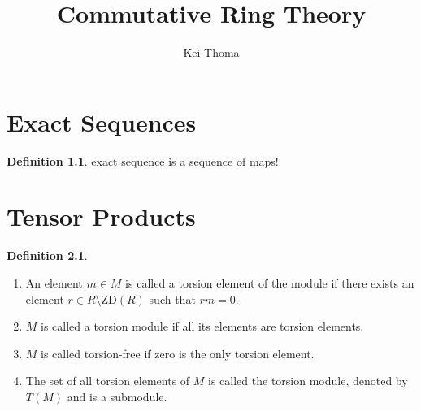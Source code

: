 \documentclass[a4paper]{book}
\title{Commutative Ring Theory}
\author{Kei Thoma}
\theoremstyle{definition}
\newtheorem{definition}{Definition}[]
\begin{document}
\chapter{Exact Sequences}
\begin{defbox}
    \begin{definition}
        exact sequence is a sequence of maps!
    \end{definition}
\end{defbox}

\chapter{Tensor Products}
\begin{defbox}
    \begin{definition}
        \begin{enumerate}
            \item An element \(m \in M\) is called a {\color{maththen}torsion element} of the module if there exists an element \(r \in R \setminus \text{ZD}(R)\) such that \(rm = 0\).
            \item \(M\) is called a {\color{maththen}torsion module} if all its elements are torsion elements.
            \item \(M\) is called {\color{maththen}torsion-free} if zero is the only torsion element.
            \item The set of all torsion elements of \(M\) is called the {\color{maththen}torsion module}, denoted by \(T(M)\) and is a submodule.
        \end{enumerate}
    \end{definition}
\end{defbox}
\end{document}
